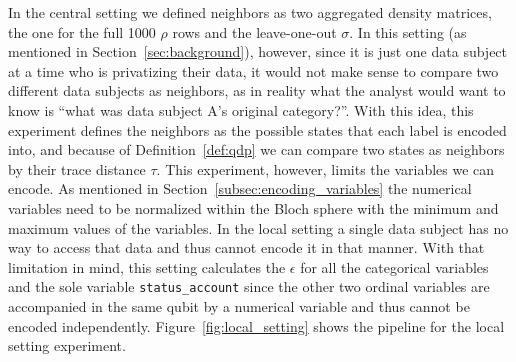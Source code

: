 \documentclass{ieeeaccess}
\begin{document}
In the central setting we defined neighbors as two aggregated density matrices, the one for the full 1000 $\rho$ rows and the leave-one-out $\sigma$. In this setting (as mentioned in Section~\ref{sec:background}), however, since it is just one data subject at a time who is privatizing their data, it would not make sense to compare two different data subjects as neighbors, as in reality what the analyst would want to know is ``what was data subject A's original category?''. With this idea, this experiment defines the neighbors as the possible states that each label is encoded into, and because of Definition~\ref{def:qdp} we can compare two states as neighbors by their trace distance $\tau$. This experiment, however, limits the variables we can encode. As mentioned in Section~\ref{subsec:encoding_variables} the numerical variables need to be normalized within the Bloch sphere with the minimum and maximum values of the variables. In the local setting a single data subject has no way to access that data and thus cannot encode it in that manner. With that limitation in mind, this setting calculates the $\epsilon$ for all the categorical variables and the sole variable \texttt{status\_account} since the other two ordinal variables are accompanied in the same qubit by a numerical variable and thus cannot be encoded independently. Figure~\ref{fig:local_setting} shows the pipeline for the local setting experiment.
\end{document}

